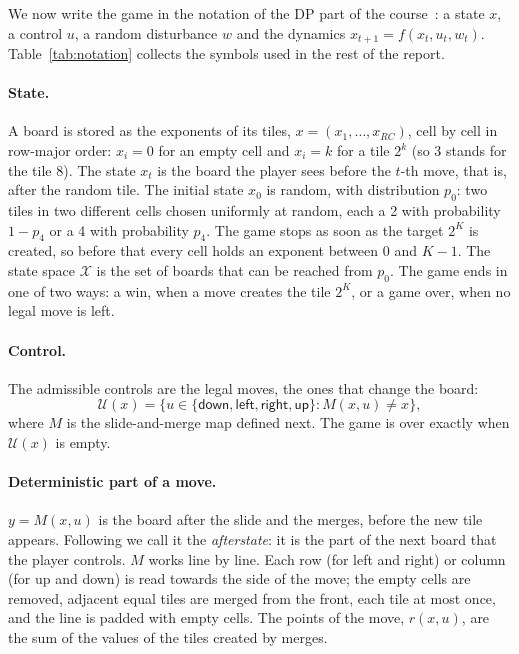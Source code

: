 \documentclass[11pt,a4paper]{article}
\theoremstyle{remark}
\newcommand{\X}{\mathcal{X}}
\newcommand{\U}{\mathcal{U}}
\newcommand{\act}[1]{\textsf{#1}}
\begin{document}
We now write the game in the notation of the DP part of the course~\cite{bertsekas2019}: a state $x$, a control $u$, a random disturbance $w$ and the dynamics $x_{t+1}=f(x_t,u_t,w_t)$. Table~\ref{tab:notation} collects the symbols used in the rest of the report.

\paragraph{State.} A board is stored as the exponents of its tiles, $x=(x_1,\dots,x_{RC})$, cell by cell in row-major order: $x_i=0$ for an empty cell and $x_i=k$ for a tile $2^k$ (so 3 stands for the tile 8). The state $x_t$ is the board the player sees before the $t$-th move, that is, after the random tile. The initial state $x_0$ is random, with distribution $p_0$: two tiles in two different cells chosen uniformly at random, each a 2 with probability $1-p_4$ or a 4 with probability $p_4$. The game stops as soon as the target $2^K$ is created, so before that every cell holds an exponent between $0$ and $K-1$. The state space $\X$ is the set of boards that can be reached from $p_0$. The game ends in one of two ways: a win, when a move creates the tile $2^K$, or a game over, when no legal move is left.

\paragraph{Control.} The admissible controls are the legal moves, the ones that change the board:
\[
\U(x)=\bigl\{u\in\{\act{down},\act{left},\act{right},\act{up}\} : M(x,u)\neq x\bigr\},
\]
where $M$ is the slide-and-merge map defined next. The game is over exactly when $\U(x)$ is empty.

\paragraph{Deterministic part of a move.} $y=M(x,u)$ is the board after the slide and the merges, before the new tile appears. Following \cite[\S6.8]{sutton2018} we call it the \emph{afterstate}: it is the part of the next board that the player controls. $M$ works line by line. Each row (for \act{left} and \act{right}) or column (for \act{up} and \act{down}) is read towards the side of the move; the empty cells are removed, adjacent equal tiles are merged from the front, each tile at most once, and the line is padded with empty cells. The points of the move, $r(x,u)$, are the sum of the values of the tiles created by merges.
\end{document}
